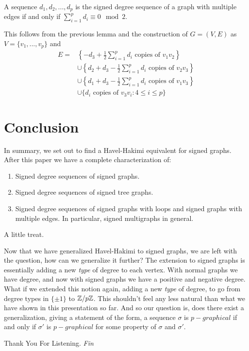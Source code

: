 \begin{frame}
	\begin{theorem}
		A sequence $d_1, d_2, ..., d_p$ is the signed degree sequence of a graph with multiple edges if and only if $\sum_{i = 1}^{p} d_i \equiv 0 \mod 2$.
	\end{theorem}
	This follows from the previous lemma and the construction of $G = (V,E)$ as $V = \{ v_1, ..., v_p \}$ and 
		\begin{align*}
			E = 
				& \left\{ -d_3 + \frac{1}{2}\sum_{i = 1}^{p} d_i \text{ copies of }  v_1v_2\right\} \\
				& \cup \left\{ d_2 + d_3 - \frac{1}{2}\sum_{i = 1}^{p} d_i \text{ copies of } v_2v_3\right\} \\
				& \cup \left\{ d_1 + d_3 - \frac{1}{2}\sum_{i = 1}^{p} d_i \text{ copies of } v_1v_3\right\} \\ 
				& \cup \{ d_i \text{ copies of } v_3v_i : 4 \leq i \leq p \}
		\end{align*}
\end{frame}



\section{Conclusion}


\begin{frame}
	In summary, we set out to find a Havel-Hakimi equivalent for signed graphs. After this paper we have a complete characterization of:
		\begin{enumerate}
			\item Signed degree sequences of signed graphs.
			\item Signed degree sequences of signed tree graphs.
			\item Signed degree sequences of signed graphs with loops and signed graphs with multiple edges. In particular, signed multigraphs in general.
		\end{enumerate}
\end{frame}


\begin{frame}{A little treat.}
	\begin{problem}
		Now that we have generalized Havel-Hakimi to signed graphs, we are left with the question, how can we generalize it further?
		The extension to signed graphs is essentially adding a new \textit{type} of degree to each vertex. With normal graphs we have degree, and now with signed graphs we have a positive and negative degree.
		What if we extended this notion again, adding a new \textit{type} of degree, to go from degree types in $\{\pm 1\}$ to $\Bbb Z/p \Bbb Z$. This shouldn't feel any less natural than what we have shown in this presentation so far.
		And so our question is, does there exist a generalization, giving a statement of the form, a sequence $\sigma$ is $p-graphical$ if and only if $\sigma'$ is $p-graphical$ for some property of $\sigma$ and $\sigma'$.
	\end{problem}
\end{frame}

\begin{frame}{Thank You For Listening.}
	\centering \Huge
	\emph{Fin}
\end{frame}
